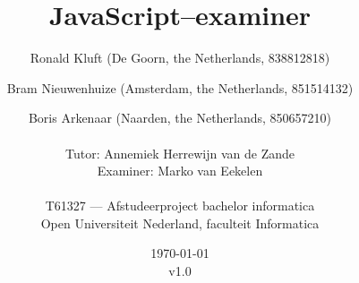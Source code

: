 
\title{JavaScript--examiner}
\author{
  Ronald Kluft (De Goorn, the Netherlands, 838812818) \and
  Bram Nieuwenhuize (Amsterdam, the Netherlands, 851514132) \and
  Boris Arkenaar (Naarden, the Netherlands, 850657210)\\
  \\
  Tutor: Annemiek Herrewijn van de Zande\\
  Examiner: Marko van Eekelen\\
  \\
  T61327 --- Afstudeerproject bachelor informatica\\
  Open Universiteit Nederland, faculteit Informatica}
\date{\today\\v1.0}
\maketitle

